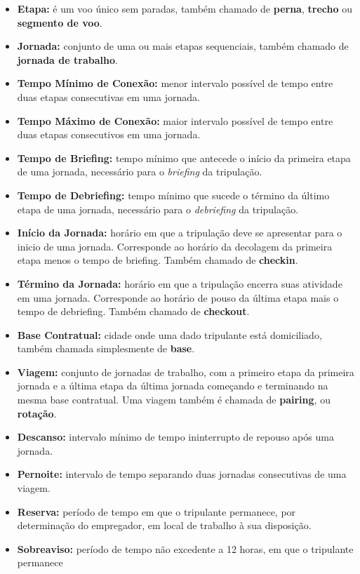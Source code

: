 \documentclass[12pt,a4paper]{article}
\begin{document}
\begin{itemize}
	\item {\bf Etapa:} é um voo único sem paradas, também chamado de {\bf perna}, {\bf trecho} ou {\bf 
	segmento de voo}.
	\item {\bf Jornada:} conjunto de uma ou mais etapas sequenciais, também chamado de {\bf jornada 
	de trabalho}. 
	\item {\bf Tempo Mínimo de Conexão:} menor intervalo possível de tempo entre duas etapas 
	consecutivas em uma jornada.
	\item {\bf Tempo Máximo de Conexão:} maior intervalo possível de tempo entre duas etapas 
	consecutivos em uma jornada.
	\item {\bf Tempo de Briefing:} tempo mínimo que antecede o início da primeira etapa de uma
	jornada, necessário para o {\it briefing} da tripulação.
	\item {\bf Tempo de Debriefing:} tempo mínimo que sucede o término da último etapa de uma jornada,
	necessário para o {\it debriefing} da tripulação.
	\item {\bf Início da Jornada:} horário em que a tripulação deve se apresentar para o inicio de
	uma jornada. Corresponde ao horário da decolagem da primeira etapa menos o tempo de briefing. 
	Também chamado de {\bf checkin}.
	\item {\bf Término da Jornada:} horário em que a tripulação encerra suas atividade em uma 
	jornada. Corresponde ao horário de pouso da última etapa mais o tempo de debriefing.
	Também chamado de {\bf checkout}.
	\item {\bf Base Contratual:} cidade onde uma dado tripulante está domiciliado, também chamada 
	simplesmente de {\bf base}.
	\item {\bf Viagem:} conjunto de jornadas de trabalho, com a primeiro etapa da primeira jornada e
	a última etapa da última jornada começando e terminando na mesma base contratual. 
	Uma viagem também é chamada de {\bf pairing}, ou {\bf rotação}.
	\item {\bf Descanso:} intervalo mínimo de tempo ininterrupto de repouso após uma jornada.
	\item {\bf Pernoite:} intervalo de tempo separando duas jornadas consecutivas de uma viagem.
	\item {\bf Reserva:} período de tempo em que o tripulante permanece, por determinação do 
	empregador, em local de trabalho à sua disposição.
	\item {\bf Sobreaviso:} período de tempo não excedente a 12 horas, em que o tripulante permanece 

\end{itemize}
\end{document}
